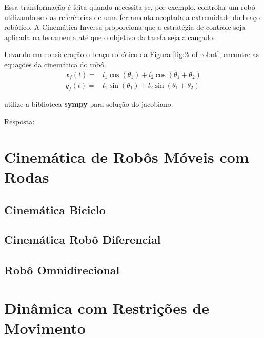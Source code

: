 Essa transformação é feita quando necessita-se, por exemplo, controlar um robô utilizando-se das referências de uma ferramenta acoplada a
extremidade do braço robótico. A Cinemática Inversa proporciona que a estratégia de controle seja aplicada na ferramenta até
que o objetivo da tarefa seja alcançado.


\begin{shortbox}
    Levando em consideração o braço robótico da Figura \ref{fig:2dof-robot}, encontre as equações da cinemática do robô.
    \begin{equation*}
        \begin{split}
            x_f(t) = & l_1\cos(\theta_1)+l_2\cos(\theta_1 + \theta_2) \\            
            y_f(t) = & l_1\sin(\theta_1)+l_2\sin(\theta_1 + \theta_2)
        \end{split}
    \end{equation*}
    
    utilize a biblioteca \textbf{sympy} para solução do jacobiano.
    \begin{center}
        Resposta:

\end{center}

\end{shortbox} 


\section{Cinemática de Robôs Móveis com Rodas}

\subsection{Cinemática Biciclo}
\subsection{Cinemática Robô Diferencial}
\subsection{Robô Omnidirecional}


\section{Dinâmica com Restrições de Movimento}
